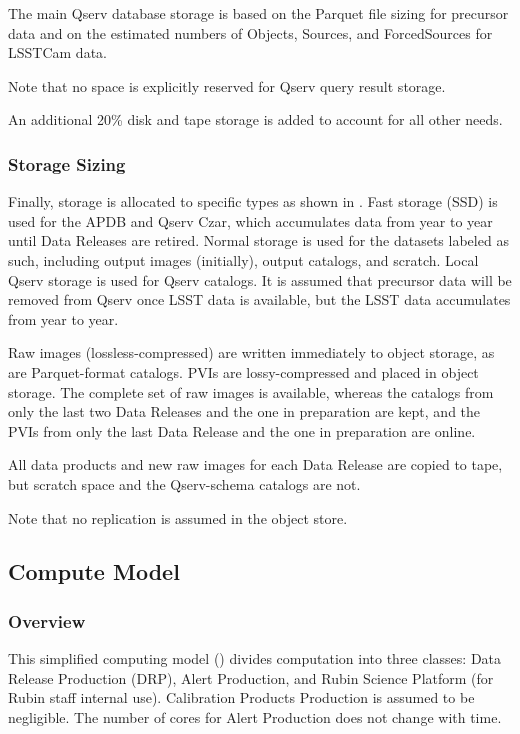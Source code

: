The main Qserv database storage is based on the Parquet file sizing for precursor data and on the estimated numbers of Objects, Sources, and ForcedSources for LSSTCam data.

Note that no space is explicitly reserved for Qserv query result storage.

An additional 20\% disk and tape storage is added to account for all other needs.



\subsubsection{Storage Sizing}

Finally, storage is allocated to specific types as shown in .
Fast storage (SSD) is used for the APDB and Qserv Czar, which accumulates data from year to year until Data Releases are retired.
Normal storage is used for the datasets labeled as such, including output images (initially), output catalogs, and scratch.
Local Qserv storage is used for Qserv catalogs.
It is assumed that precursor data will be removed from Qserv once LSST data is available, but the LSST data accumulates from year to year.

Raw images (lossless-compressed) are written immediately to object storage, as are Parquet-format catalogs.
PVIs are lossy-compressed and placed in object storage.
The complete set of raw images is available, whereas the catalogs from only the last two Data Releases and the one in preparation are kept, and the PVIs from only the last Data Release and the one in preparation are online.

All data products and new raw images for each Data Release are copied to tape, but scratch space and the Qserv-schema catalogs are not.

Note that no replication is assumed in the object store.

\subsection{Compute Model}


\subsubsection{Overview}
This simplified computing model () divides computation into three classes: Data Release Production (DRP), Alert Production, and Rubin Science Platform (for Rubin staff internal use).
Calibration Products Production is assumed to be negligible.
The number of cores for Alert Production does not change with time.

